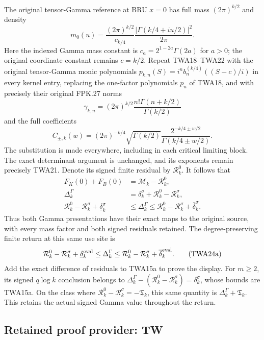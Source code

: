 \documentclass[11pt,a4paper]{article}
\begin{document}
The original tensor-Gamma reference at BRU $x=0$ has full mass
$(2\pi)^{k/2}$ and density
\[
m_0(u)=\frac{(2\pi)^{k/2}}{c_{k/4}}
                   \frac{|\Gamma(k/4+iu/2)|^2}{2\pi}.
\]
Here the indexed Gamma mass constant is
$c_a=2^{1-2a}\Gamma(2a)$ for $a>0$; the original coordinate
constant remains $c=k/2$.
Repeat TWA18--TWA22 with the original tensor-Gamma monic polynomials
$p_{k,n}(S)=i^n b_n^{(k/4)}((S-c)/i)$ in every kernel entry,
replacing the one-factor polynomials $p_n$ of TWA18, and with
precisely their original FPK.27 norms
\[
\gamma_{k,n}=(2\pi)^{k/2}
                   \frac{n!\Gamma(n+k/2)}{\Gamma(k/2)}
\]
and the full coefficients
\[
C_{\pm,k}(w)=(2\pi)^{-k/4}\sqrt{\Gamma(k/2)}
              \frac{2^{-k/4\pm w/2}}{\Gamma(k/4\pm w/2)}.
\]
The substitution is made everywhere, including in each critical
limiting block. The exact determinant argument is unchanged, and
its exponents remain precisely TWA21. Denote its signed finite
residual by $\mathcal R_k^0$. It follows that
\[
\boxed{\begin{aligned}
F_K(0)+F_B(0)&=\mathcal M_k-\mathcal R_k^0,\\
\Delta_k^\Gamma
&=\delta_k^\sigma+\mathcal R_k^0-\mathcal R_k^\sigma,\\
\mathcal R_k^0-\mathcal R_k^\sigma+\underline\delta_k^\sigma
&\leq\Delta_k^\Gamma
\leq\mathcal R_k^0-\mathcal R_k^\sigma+\overline\delta_k^\sigma.
\end{aligned}}\tag{TWA24}
\]
Thus both Gamma presentations have their exact maps to the original
source, with every mass factor and both signed residuals retained.
The degree-preserving finite return at this same use site is
\[
 \mathcal R_k^0-\mathcal R_k^\sigma+\underline\delta_k^{\rm eval}
 \leq\Delta_k^\Gamma
 \leq\mathcal R_k^0-\mathcal R_k^\sigma+\overline\delta_k^{\rm eval}.
 \tag{TWA24a}
\]
Add the exact difference of residuals to TWA15a to prove the
display. For $m\geq2$, its signed $q\log k$ conclusion belongs
to $\Delta_k^\Gamma-(\mathcal R_k^0-\mathcal R_k^\sigma)
=\delta_k^\sigma$, whose bounds are TWA15a. On the class where
$\mathcal R_k^0-\mathcal R_k^\sigma=-\mathfrak T_k$, this same
quantity is $\Delta_k^\Gamma+\mathfrak T_k$. This retains the
actual signed Gamma value throughout the return.



\clearpage
\subsection*{Retained proof provider: TW}
\end{document}
